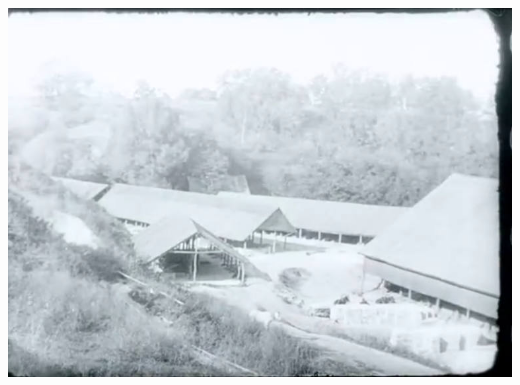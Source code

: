 \vspace*{\fill}
\newpage
\vspace*{\fill}
\begin{center}
\includegraphics[width=\linewidth]{pix/zaic.jpg}
\end{center} 

